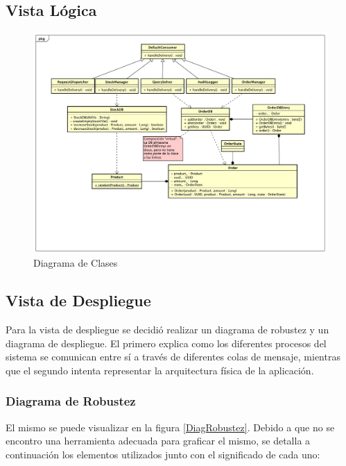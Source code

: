 \documentclass[a4paper,10pt]{article}
\begin{document}
    \newpage
    \subsection{Vista Lógica}
        \begin{figure}[!htb]                                             
            \centering                                                   
            \includegraphics[width=18cm,angle=90,origin=c]{Imagenes/Diagrama_Clases.pdf} 
            \caption{Diagrama de Clases} \label{DiagClases}
        \end{figure}

    \newpage
    \subsection{Vista de Despliegue}
        Para la vista de despliegue se decidió realizar un diagrama de 
        robustez y un diagrama de despliegue. El primero explica como los 
        diferentes procesos del sistema se comunican entre sí a través de 
        diferentes colas de mensaje, mientras que el segundo intenta representar
        la arquitectura física de la aplicación.
        
        \subsubsection{Diagrama de Robustez}
        El mismo se puede visualizar en la figura \ref{DiagRobustez}. Debido 
        a que no se encontro una herramienta adecuada para graficar el mismo,
        se detalla a continuación los elementos utilizados junto con el
        significado de cada uno:
\end{document}
